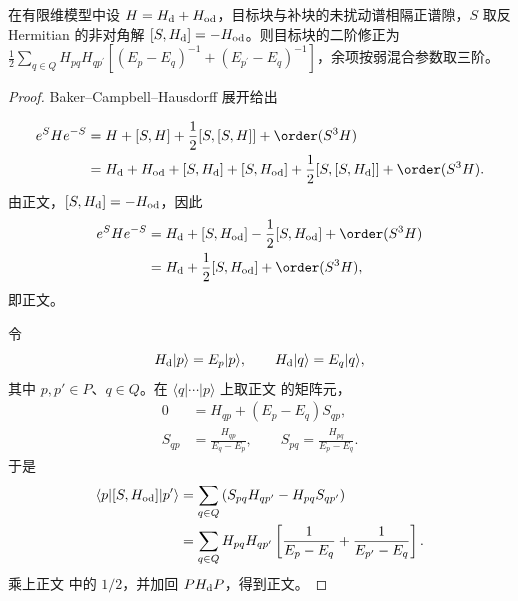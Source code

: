 \begin{proposition}
在有限维模型中设 $H=H_{\rm d}+H_{\rm od}$，目标块与补块的未扰动谱相隔正谱隙，$S$ 取反 Hermitian 的非对角解 $[S,H_{\rm d}]=-H_{\rm od}$。则目标块的二阶修正为 $\frac12\sum_{q\in Q}H_{pq}H_{qp^\prime}[(E_p-E_q)^{-1}+(E_{p^\prime}-E_q)^{-1}]$，余项按弱混合参数取三阶。
\end{proposition}
\begin{proof}
Baker--Campbell--Hausdorff 展开给出

\begin{align*}
 e^SHe^{-S}
 &=H+[S,H]+\frac12[S,[S,H]]+\order(S^3H)\\
 &=H_{\rm d}+H_{\rm od}+[S,H_{\rm d}]+[S,H_{\rm od}]
 +\frac12[S,[S,H_{\rm d}]]+\order(S^3H).
\end{align*}
由正文，$[S,H_{\rm d}]=-H_{\rm od}$，因此
\begin{align*}
 e^SHe^{-S}
 &=H_{\rm d}+[S,H_{\rm od}]
 -\frac12[S,H_{\rm od}]+\order(S^3H)\\
 &=H_{\rm d}+\frac12[S,H_{\rm od}]+\order(S^3H),
\end{align*}
即正文。

令
\begin{equation*}
 H_{\rm d}|p\rangle=E_p|p\rangle,
 \qquad
 H_{\rm d}|q\rangle=E_q|q\rangle,
\end{equation*}
其中 $p,p'\in P$、$q\in Q$。在 $\langle q|\cdots|p\rangle$ 上取正文 的矩阵元，
\begin{align*}
 0&=H_{qp}+(E_p-E_q)S_{qp},\\
 S_{qp}&=\frac{H_{qp}}{E_q-E_p},
 \qquad
 S_{pq}=\frac{H_{pq}}{E_p-E_q}.
\end{align*}
于是
\begin{align*}
 \langle p|[S,H_{\rm od}]|p'\rangle
 &=\sum_{q\in Q}
 \left(S_{pq}H_{qp'}-H_{pq}S_{qp'}\right)\\
 &=\sum_{q\in Q}H_{pq}H_{qp'}
 \left[
 \frac1{E_p-E_q}
 +\frac1{E_{p'}-E_q}
 \right].
\end{align*}
乘上正文 中的 $1/2$，并加回 $P H_{\rm d}P$，得到正文。
\end{proof}

